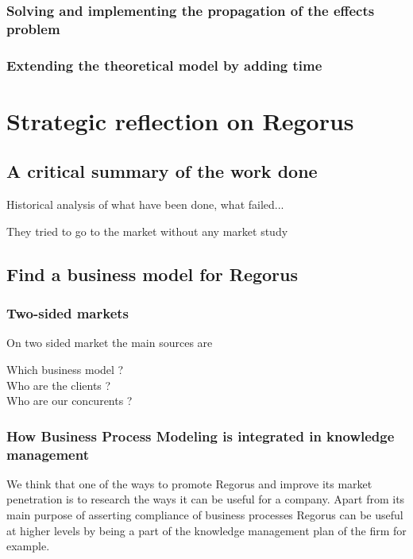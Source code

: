 \documentclass[10pt]{article}
\begin{document}
\subsubsection{Solving and implementing the propagation of the effects problem}

\subsubsection{Extending the theoretical model by adding time}

\newpage
\section{Strategic reflection on Regorus}
\subsection{A critical summary of the work done}
Historical analysis of what have been done, what failed...

They tried to go to the market without any market study

\subsection{Find a business model for Regorus}

\subsubsection{Two-sided markets}
On two sided market the main sources are \autocite{ParkerA05} \autocite{eisenmann2006strategies} \autocite{rochet2003platform}

Which business model ?\\
Who are the clients ?\\
Who are our concurents ?\\

\subsubsection{How Business Process Modeling is integrated in knowledge management}

We think that one of the ways to promote Regorus and improve its market penetration is to research the ways it can be useful for a company. Apart from its main purpose of asserting compliance of business processes Regorus can be useful at higher levels by being a part of the knowledge management plan of the firm for example.
\end{document}
